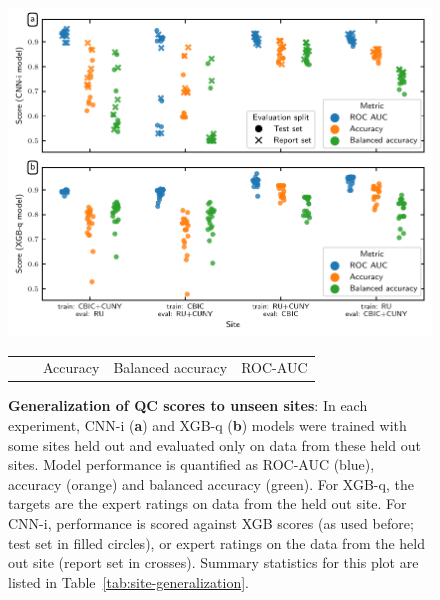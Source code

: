 \documentclass[fleqn,10pt,inline]{wlscirep}
\begin{document}
\begin{figure}[tbp]
    {\label{fig:site-generalization:dl}}
    {\label{fig:site-generalization:xgb}}
    \centering
    \includegraphics[width=\linewidth]{site-generalization/site_generalization.pdf}
    \caption{%
        {\bf Generalization of QC scores to unseen sites}: In each experiment, CNN-i (\textbf{a}) and XGB-q (\textbf{b}) models were trained with some sites held out and evaluated only on data from these held out sites. Model performance is quantified as ROC-AUC (blue), accuracy (orange) and balanced accuracy (green). For XGB-q, the targets are the expert ratings on data from the held out site. For CNN-i, performance is scored against XGB scores (as used before; test set in filled circles), or expert ratings on the data from the held out site (report set in crosses). Summary statistics for this plot are listed in Table~\ref{tab:site-generalization}.
    }
    \label{fig:site-generalization}
    \vspace{1em}
    \begin{tabular}{lllll}
    \toprule
          &                            &       Accuracy & Balanced accuracy &        ROC-AUC \\

\end{tabular}
\end{figure}
\end{document}
